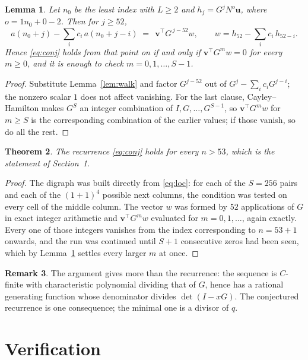 \documentclass[11pt,a4paper]{article}
\theoremstyle{plain}
\newtheorem{theorem}{Theorem}
\newtheorem{lemma}[theorem]{Lemma}
\theoremstyle{definition}
\newtheorem{remark}[theorem]{Remark}
\begin{document}
\begin{lemma}\label{lem:crit}
Let $n_0$ be the least index with $L\ge2$ and $h_j=G^{j}N^{o}\mathbf{u}$, where
$o=1n_0+0-2$. Then for $j\ge52$,
\[
a(n_0+j)-\sum_i c_i\,a(n_0+j-i)\;=\;\,\mathbf{v}^{\!\top}G^{\,j-52}w,
\qquad w=h_{52}-\sum_i c_i\,h_{52-i} .
\]
Hence \eqref{eq:conj} holds from that point on if and only if
$\mathbf{v}^{\!\top}G^{m}w=0$ for every $m\ge0$, and it is enough to check
$m=0,1,\dots,S-1$.
\end{lemma}

\begin{proof}
Substitute Lemma~\ref{lem:walk} and factor $G^{j-52}$ out of
$G^{j}-\sum_ic_iG^{j-i}$; the nonzero scalar $1$ does not affect
vanishing. For the last clause, Cayley--Hamilton makes $G^{S}$ an integer combination of
$I,G,\dots,G^{S-1}$, so $\mathbf{v}^{\!\top}G^{m}w$ for $m\ge S$ is the corresponding
combination of the earlier values; if those vanish, so do all the rest.
\end{proof}

\begin{theorem}
The recurrence \eqref{eq:conj} holds for every $n>53$, which is the statement of
Section~1.
\end{theorem}

\begin{proof}
The digraph was built directly from \eqref{eq:loc}: for each of the $S=256$ pairs and each
of the $(1+1)^{4}$ possible next columns, the condition was tested on every cell of
the middle column. The vector $w$ was formed by $52$ applications of $G$ in exact integer
arithmetic and $\mathbf{v}^{\!\top}G^{m}w$ evaluated for $m=0,1,\dots$, again exactly.
Every one of those integers vanishes from the index corresponding to $n=53+1$ onwards,
and the run was continued until $S+1$ consecutive zeros had been seen, which by
Lemma~\ref{lem:crit} settles every larger $m$ at once.
\end{proof}

\begin{remark}
The argument gives more than the recurrence: the sequence is $C$-finite with characteristic
polynomial dividing that of $G$, hence has a rational generating function whose denominator
divides $\det(I-xG)$. The conjectured recurrence is one consequence; the minimal one is a
divisor of $q$.
\end{remark}

\section{Verification}
\end{document}
